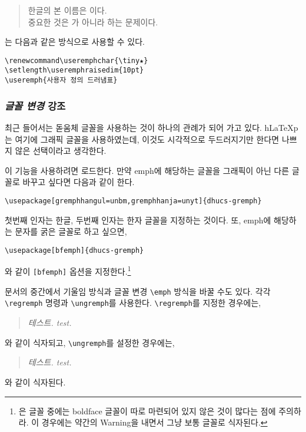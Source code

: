 \begin{quote}
한글의 본 이름은 이다.\\
중요한 것은 가 아니라  하는 문제이다.
\end{quote}

\renewcommand\useremphchar{\tiny★}
\setlength\useremphraisedim{10pt}
는 다음과 같은 방식으로 사용할 수 있다.

\begin{verbatim}
\renewcommand\useremphchar{\tiny★}
\setlength\useremphraisedim{10pt}
\useremph{사용자 정의 드러냄표}
\end{verbatim}

\subsubsection{\protect\emph{글꼴 변경} 강조}

최근 들어서는 돋움체 글꼴을 사용하는 것이 하나의 관례가 되어 가고
있다. h\LaTeX{p}는 여기에 그래픽 글꼴을 사용하였는데, 이것도 
시각적으로 두드러지기만 한다면 나쁘지 않은 선택이라고 생각한다.

이 기능을 사용하려면 \를 로드한다. 만약 emph에 해당하는
글꼴을 그래픽이 아닌 다른 글꼴로 바꾸고 싶다면 다음과 같이 한다.
\begin{verbatim}
\usepackage[gremphhangul=unbm,gremphhanja=unyt]{dhucs-gremph}
\end{verbatim}
첫번째 인자는 한글, 두번째 인자는 한자 글꼴을 지정하는 것이다.
또, emph에 해당하는 문자를 굵은 글꼴로 하고 싶으면,
\begin{verbatim}
\usepackage[bfemph]{dhucs-gremph}
\end{verbatim}
와 같이 \verb|[bfemph]| 옵션을 지정한다.\footnote{%
	은 글꼴 중에는 boldface 글꼴이 따로 마련되어 있지 않은 것이 많다는
	점에 주의하라. 이 경우에는 약간의 Warning을 내면서 그냥 보통 글꼴로
	식자된다.}

문서의 중간에서 기울임 방식과 글꼴 변경 \verb|\emph| 방식을 바꿀 수도 있다.
각각 \verb|\regremph| 명령과 \verb|\ungremph|를 사용한다. 
\regremph\verb|\regremph|를 지정한 경우에는,
\begin{quote}
\emph{테스트. test.}
\end{quote}
와 같이 식자되고, \ungremph\verb|\ungremph|를
설정한 경우에는, 
\begin{quote}
\emph{테스트. test.}
\end{quote}
와 같이 식자된다.
\regremph

